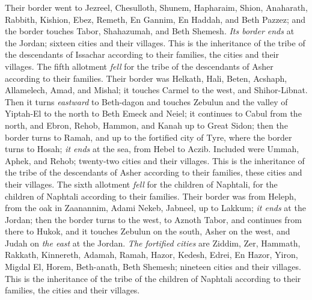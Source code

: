\begin{biblechapter}
\verse Their border went to Jezreel, Chesulloth, Shunem,
\verse Hapharaim, Shion, Anaharath,
\verse Rabbith, Kishion, Ebez,
\verse Remeth, En Gannim, En Haddah, and Beth Pazzez;
\verse and the border touches Tabor, Shahazumah, and Beth Shemesh. \textit{Its border ends} at the Jordan; sixteen cities and their villages.
\verse This is the inheritance of the tribe of the descendants of Issachar according to their families, the cities and their villages.
 The fifth allotment \textit{fell} for the tribe of the descendants of Asher according to their families.
\verse Their border was Helkath, Hali, Beten, Acshaph,
\verse Allamelech, Amad, and Mishal; it touches Carmel to the west, and Shihor-Libnat.
\verse Then it turns \textit{eastward} to Beth-dagon and touches Zebulun and the valley of Yiptah-El to the north to Beth Emeck and Neiel; it continues to Cabul from the north,
\verse and Ebron, Rehob, Hammon, and Kanah up to Great Sidon;
\verse then the border turns to Ramah, and up to the fortified city of Tyre, where the border turns to Hosah; \textit{it ends} at the sea, from Hebel to Aczib.
\verse Included were Ummah, Aphek, and Rehob; twenty-two cities and their villages.
\verse This is the inheritance of the tribe of the descendants of Asher according to their families, these cities and their villages.
 The sixth allotment \textit{fell} for the children of Naphtali, for the children of Naphtali according to their families.
\verse Their border was from Heleph, from the oak in Zaanannim, Adami Nekeb, Jabneel, up to Lakkum; \textit{it ends} at the Jordan;
\verse then the border turns to the west, to Aznoth Tabor, and continues from there to Hukok, and it touches Zebulun on the south, Asher on the west, and Judah on \textit{the east} at the Jordan.
\verse \textit{The fortified cities} are Ziddim, Zer, Hammath, Rakkath, Kinnereth,
\verse Adamah, Ramah, Hazor,
\verse Kedesh, Edrei, En Hazor,
\verse Yiron, Migdal El, Horem, Beth-anath, Beth Shemesh; nineteen cities and their villages.
\verse This is the inheritance of the tribe of the children of Naphtali according to their families, the cities and their villages.

\end{biblechapter}
